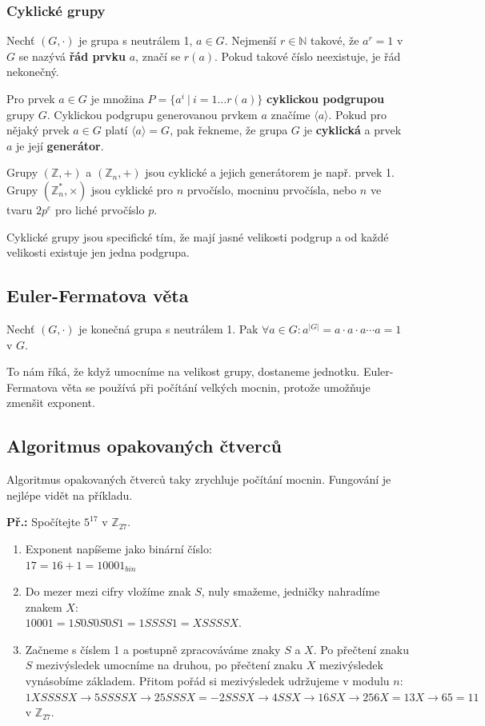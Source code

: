 \subsubsection{Cyklické grupy}

Nechť $(G,\cdot)$ je grupa s neutrálem 1, $a \in G$. Nejmenší $r \in \mathbb{N}$
takové, že $a^r = 1$ v $G$ se nazývá \textbf{řád prvku} $a$, značí se $r(a)$.
Pokud takové číslo neexistuje, je řád nekonečný.

Pro prvek $a \in G$ je množina $P = \{a^i~|~i = 1 \ldots r(a)\}$
\textbf{cyklickou podgrupou} grupy $G$. Cyklickou podgrupu generovanou prvkem
$a$ značíme $\langle a \rangle$. Pokud pro nějaký prvek $a \in G$ platí $\langle
a \rangle  = G$, pak řekneme, že grupa $G$ je \textbf{cyklická} a prvek $a$ je
její \textbf{generátor}.

Grupy $(\mathbb{Z}, +)$ a $(\mathbb{Z}_n, +)$ jsou cyklické a jejich generátorem
je např. prvek 1. Grupy $(\mathbb{Z}_n^*, \times)$ jsou cyklické pro $n$
prvočíslo, mocninu prvočísla, nebo $n$ ve tvaru $2p^e$ pro liché prvočíslo $p$.

Cyklické grupy jsou specifické tím, že mají jasné velikosti podgrup a od každé
velikosti existuje jen jedna podgrupa.

\subsection{Euler-Fermatova věta}
Nechť $(G,\cdot)$ je konečná grupa s neutrálem 1. Pak $\forall a \in G: a^{|G|}
= a\cdot a\cdot a\cdots a = 1$ v $G$.

To nám říká, že když umocníme na velikost grupy, dostaneme jednotku.
Euler-Fermatova věta se používá při počítání velkých mocnin, protože umožňuje
zmenšit exponent.

\subsection{Algoritmus opakovaných čtverců}

Algoritmus opakovaných čtverců taky zrychluje počítání mocnin. Fungování je
nejlépe vidět na příkladu.

\begin{exercise}
\textbf{Př.:} Spočítejte $5^{17}$ v $\mathbb{Z}_{27}$.
\begin{enumerate}
\item Exponent napíšeme jako binární číslo:\\ $17 = 16 + 1 = 10001_{bin}$
\item Do mezer mezi cifry vložíme znak $S$, nuly smažeme, jedničky nahradíme
znakem $X$:\\ $10001 = 1S0S0S0S1 = 1SSSS1 = XSSSSX$.
\item Začneme s číslem 1 a postupně zpracováváme znaky $S$ a $X$. Po přečtení
znaku $S$ mezivýsledek umocníme na druhou, po přečtení znaku $X$ mezivýsledek
vynásobíme základem. Přitom pořád si mezivýsledek udržujeme v modulu $n$:\\
$1XSSSSX \rightarrow 5SSSSX \rightarrow 25SSSX = -2SSSX \rightarrow 4SSX
\rightarrow 16SX \rightarrow 256X = 13X \rightarrow 65 = 11$ v
$\mathbb{Z}_{27}$.
\end{enumerate}
\end{exercise}

